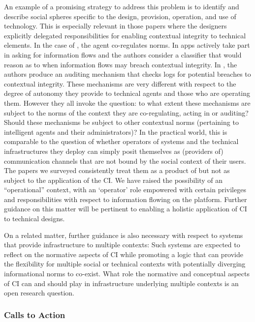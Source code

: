\documentclass[../thesis.tex]{subfiles}
\begin{document}
An example of a promising strategy to address this problem is to
identify and describe social spheres specific to the design, provision,
operation, and use of technology. This is especially relevant in those
papers where the designers explicitly delegated responsibilities for
enabling contextual integrity to technical elements. In the case of
\citet{criado2015implicit}, the agent co-regulates norms.
In \citet{wijesekera2015android} apps actively take
part in asking for information flows
and the authors consider a classifier that would reason as to when
information flows may breach contextual integrity.
In \citet{samavi2012l2tap+}, the
authors produce an auditing mechanism that checks logs for potential
breaches to contextual integrity. These mechanisms are very different
with respect to the degree of autonomy they provide to technical agents
and those who are operating them. However they all invoke the question:
to what extent these mechanisms are subject to the norms of the context
they are co-regulating, acting in or auditing? Should these mechanisms
be subject to other contextual norms (pertaining to intelligent agents
and their administrators)? In the practical world, this is comparable
to the question of whether operators of systems and the technical
infrastructures they deploy can simply posit themselves as (providers
of) communication channels that are not bound by the social context of
their users. The papers we surveyed consistently treat them as a
product of but not as subject to the application of the CI. We have
raised the possibility of an
``operational'' context, with an
`operator' role empowered with certain
privileges and responsibilities with respect to information flowing on
the platform. Further guidance on this matter will be pertinent to
enabling a holistic application of CI to technical designs.

On a related matter, further guidance is also necessary with respect to
systems that provide infrastructure to multiple contexts: Such
systems are expected to reflect on the normative aspects of CI while
promoting a logic that can provide the flexibility for multiple social
or technical contexts with potentially diverging informational norms to
co-exist. What role the normative and conceptual aspects of CI can and
should play in infrastructure underlying multiple contexts is an open
research question.

\subsubsection{Calls to Action}
\label{CI5.1.2}
\end{document}
